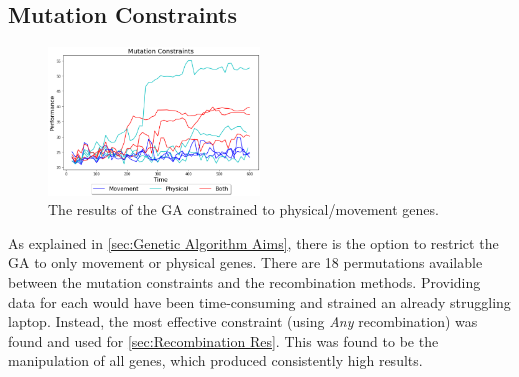 \documentclass{article}
\begin{document}
\subsection{Mutation Constraints}
\label{sec:Mutation Res}
\begin{figure}
    \centering
    \vspace*{-5mm}
    \includegraphics[width=0.5\textwidth]{mutationTypes}
    \vspace*{-7mm}
    \caption{The results of the GA constrained to physical/movement genes.}
\end{figure}
As explained in \ref{sec:Genetic Algorithm Aims}, there is the option to restrict the GA to only movement or physical genes. There are 18 permutations available between the mutation constraints and the recombination methods. Providing data for each would have been time-consuming and strained an already struggling laptop. Instead, the most effective constraint (using \textit{Any} recombination) was found and used for \ref{sec:Recombination Res}.
This was found to be the manipulation of all genes, which produced consistently high results.
\end{document}
